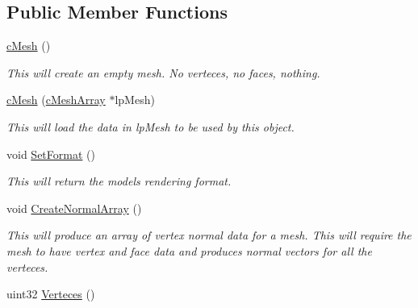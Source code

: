 \subsection*{Public Member Functions}
\begin{DoxyCompactItemize}
\item 
\hypertarget{classc_mesh_a1b689b9d00f34fe7e4cbf8910bb310f9}{
\hyperlink{classc_mesh_a1b689b9d00f34fe7e4cbf8910bb310f9}{cMesh} ()}
\label{classc_mesh_a1b689b9d00f34fe7e4cbf8910bb310f9}

\begin{DoxyCompactList}\small\item\em This will create an empty mesh. No verteces, no faces, nothing. \end{DoxyCompactList}\item 
\hypertarget{classc_mesh_ae24161941f8538d55caa144d76b535bc}{
\hyperlink{classc_mesh_ae24161941f8538d55caa144d76b535bc}{cMesh} (\hyperlink{classc_mesh_array}{cMeshArray} $\ast$lpMesh)}
\label{classc_mesh_ae24161941f8538d55caa144d76b535bc}

\begin{DoxyCompactList}\small\item\em This will load the data in lpMesh to be used by this object. \end{DoxyCompactList}\item 
\hypertarget{classc_mesh_a8dd2a8840d8e2c6aaefa95884a2f9f68}{
void \hyperlink{classc_mesh_a8dd2a8840d8e2c6aaefa95884a2f9f68}{SetFormat} ()}
\label{classc_mesh_a8dd2a8840d8e2c6aaefa95884a2f9f68}

\begin{DoxyCompactList}\small\item\em This will return the models rendering format. \end{DoxyCompactList}\item 
\hypertarget{classc_mesh_a5f35c2b9245d765b7958f91379d63e7d}{
void \hyperlink{classc_mesh_a5f35c2b9245d765b7958f91379d63e7d}{CreateNormalArray} ()}
\label{classc_mesh_a5f35c2b9245d765b7958f91379d63e7d}

\begin{DoxyCompactList}\small\item\em This will produce an array of vertex normal data for a mesh. This will require the mesh to have vertex and face data and produces normal vectors for all the verteces. \end{DoxyCompactList}\item 
\hypertarget{classc_mesh_a13513f988b641fb082e6e00d1e6c64e2}{
uint32 \hyperlink{classc_mesh_a13513f988b641fb082e6e00d1e6c64e2}{Verteces} ()}
\label{classc_mesh_a13513f988b641fb082e6e00d1e6c64e2}


\end{DoxyCompactItemize}
